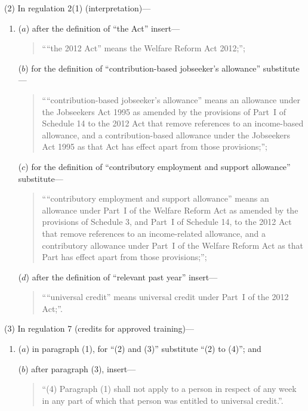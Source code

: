 \documentclass[12pt,a4paper]{article}
\begin{document}
(2) In regulation 2(1) (interpretation)—
\begin{enumerate}\item[]
($a$) after the definition of “the Act” insert—
\begin{quotation}
““the 2012 Act” means the Welfare Reform Act 2012;”;
\end{quotation}

($b$) for the definition of “contribution-based jobseeker’s allowance” substitute—
\begin{quotation}
““contribution-based jobseeker’s allowance” means an allowance under the Jobseekers Act 1995 as amended by the provisions of Part~I of Schedule 14 to the 2012 Act that remove references to an income-based allowance, and a contribution-based allowance under the Jobseekers Act 1995 as that Act has effect apart from those provisions;”;
\end{quotation}

($c$) for the definition of “contributory employment and support allowance” substitute—
\begin{quotation}
““contributory employment and support allowance” means an allowance under Part~I of the Welfare Reform Act as amended by the provisions of Schedule 3, and Part~I of Schedule 14, to the 2012 Act that remove references to an income-related allowance, and a contributory allowance under Part~I of the Welfare Reform Act as that Part has effect apart from those provisions;”;
\end{quotation}

($d$) after the definition of “relevant past year” insert—
\begin{quotation}
““universal credit” means universal credit under Part~I of the 2012 Act;”.
\end{quotation}
\end{enumerate}

(3) In regulation 7 (credits for approved training)—
\begin{enumerate}\item[]
($a$) in paragraph (1), for “(2) and (3)” substitute “(2) to (4)”; and

($b$) after paragraph (3), insert—
\begin{quotation}
“(4) Paragraph (1) shall not apply to a person in respect of any week in any part of which that person was entitled to universal credit.”.
\end{quotation}
\end{enumerate}
\end{document}
